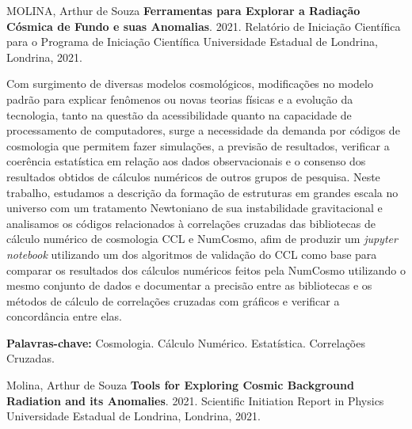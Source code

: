 \documentclass[12pt,a4paper,oneside,brazil]{abntex2}
\theoremstyle{definition}
\numberwithin{defin}{section}
\numberwithin{thm}{section}
\numberwithin{notation}{section}
\theoremstyle{remark}
\numberwithin{exmp}{section}
\numberwithin{p}{section}
\numberwithin{lema}{section}
\begin{document}
	\begin{SingleSpace}
		\noindent MOLINA, Arthur de Souza \textbf{Ferramentas para Explorar a Radiação Cósmica de Fundo e suas Anomalias}.
		2021. Relatório de Iniciação Científica para o Programa de Iniciação Científica \textendash{}
		Universidade Estadual de Londrina, Londrina, 2021.
	\end{SingleSpace}
	
	\setlength{\absparsep}{18pt}
	
	\begin{resumo}
		
		Com surgimento de diversas modelos cosmológicos, modificações no modelo padrão para explicar fenômenos ou novas teorias físicas e a evolução da tecnologia, tanto na questão da acessibilidade quanto na capacidade de processamento de computadores, surge a necessidade da demanda por códigos de cosmologia que permitem fazer simulações, a previsão de resultados, verificar a coerência estatística em relação aos dados observacionais e o consenso dos resultados obtidos de cálculos numéricos de outros grupos de pesquisa. Neste trabalho, estudamos a descrição da formação de estruturas em grandes escala no universo com um tratamento Newtoniano de sua instabilidade gravitacional e analisamos os códigos relacionados à correlações cruzadas das bibliotecas de cálculo numérico de cosmologia CCL e NumCosmo, afim de produzir um \textit{jupyter notebook} utilizando um dos algoritmos de validação do CCL como base para comparar os resultados dos cálculos numéricos feitos pela NumCosmo utilizando o mesmo conjunto de dados e documentar a precisão entre as bibliotecas e os métodos de cálculo de correlações cruzadas com gráficos e verificar a concordância entre elas.
		
		\textbf{Palavras-chave:} Cosmologia. Cálculo Numérico.
		 Estatística. Correlações Cruzadas.
	\end{resumo}
	

	
	\begin{SingleSpace}
		\noindent Molina, Arthur de Souza \textbf{Tools for Exploring Cosmic Background Radiation and its Anomalies}. 2021.
		Scientific Initiation Report in Physics \textendash{} Universidade
		Estadual de Londrina, Londrina, 2021.
	\end{SingleSpace}
	
	\setlength{\absparsep}{18pt}
	
\end{document}
